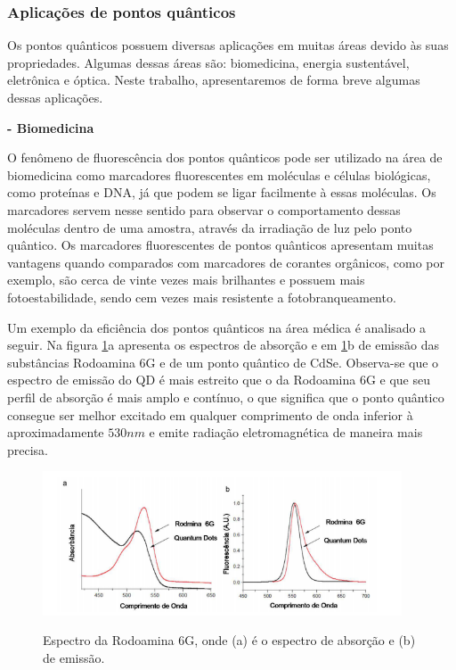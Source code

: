 \subsubsection{Aplicações de pontos quânticos}

	\par Os pontos quânticos possuem diversas aplicações em muitas áreas devido às suas propriedades. Algumas dessas áreas são: biomedicina, energia sustentável, eletrônica e óptica.  Neste trabalho, apresentaremos de forma breve algumas dessas aplicações.

	\par \textbf{- Biomedicina}

		\par O fenômeno de fluorescência dos pontos quânticos pode ser utilizado na área de biomedicina como marcadores fluorescentes em moléculas e células biológicas, como proteínas e DNA, já que podem se ligar facilmente à essas moléculas. Os marcadores servem nesse sentido para observar o comportamento dessas moléculas dentro de uma amostra, através da irradiação de luz pelo ponto quântico\cite{bulk2}. Os marcadores fluorescentes de pontos quânticos apresentam muitas vantagens quando comparados com marcadores de corantes orgânicos, como por exemplo, são cerca de vinte vezes mais brilhantes e possuem mais fotoestabilidade, sendo cem vezes mais resistente a fotobranqueamento\cite{sintese8}.

		\par Um exemplo da eficiência dos pontos quânticos na área médica é analisado a seguir. Na figura \ref{fig23}a apresenta os espectros de absorção e em \ref{fig23}b de emissão das substâncias Rodoamina 6G e de um ponto quântico de CdSe. Observa-se que o espectro de emissão do QD é mais estreito que o da Rodoamina 6G e que seu perfil de absorção é mais amplo e contínuo, o que significa que o ponto quântico consegue ser melhor excitado em qualquer comprimento de onda inferior à aproximadamente $530nm$ e emite radiação eletromagnética de maneira mais precisa.

		\begin{figure}[H]
		  \centering
		  \caption{Espectro da Rodoamina 6G, onde (a) é o espectro de absorção e (b) de emissão.\cite{sintese9}}
		  \includegraphics[width=0.95\textwidth]{images/figura23.png}
		  \label{fig23}
		\end{figure}

